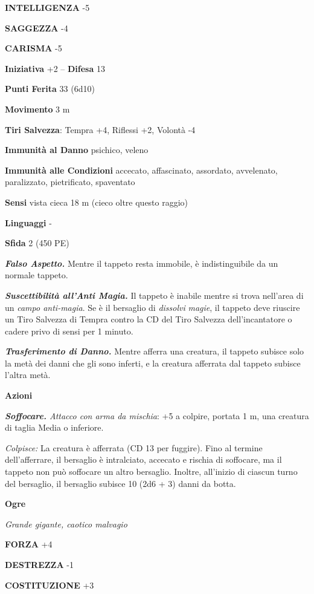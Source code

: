 \begin{multicols}{2}
\textbf{INTELLIGENZA} -5

\textbf{SAGGEZZA} -4

\textbf{CARISMA} -5

\textbf{Iniziativa} +2 -- \textbf{Difesa} 13

\textbf{Punti Ferita} 33 (6d10)

\textbf{Movimento} 3 m

\textbf{Tiri Salvezza}: Tempra +4, Riflessi +2, Volontà -4

\textbf{Immunità al Danno} psichico, veleno

\textbf{Immunità alle Condizioni} accecato, affascinato, assordato, avvelenato, paralizzato, pietrificato, spaventato

\textbf{Sensi} vista cieca 18 m (cieco oltre questo raggio)

\textbf{Linguaggi} -

\textbf{Sfida} 2 (450 PE)

\emph{\textbf{Falso Aspetto.}} Mentre il tappeto resta immobile, è indistinguibile da un normale tappeto.

\emph{\textbf{Suscettibilità all'Anti Magia.}} Il tappeto è inabile mentre si trova nell'area di un \emph{campo anti-magia}. Se è il bersaglio di \emph{dissolvi} \emph{magie}, il tappeto deve riuscire un Tiro Salvezza di Tempra contro la CD del Tiro Salvezza dell'incantatore o cadere privo di sensi per 1 minuto.

\emph{\textbf{Trasferimento di Danno.}} Mentre afferra una creatura, il tappeto subisce solo la metà dei danni che gli sono inferti, e la creatura afferrata dal tappeto subisce l'altra metà.

\textbf{Azioni}

\emph{\textbf{Soffocare.} Attacco con arma da mischia}: +5 a colpire, portata 1 m, una creatura di taglia Media o inferiore.

\emph{Colpisce:} La creatura è afferrata (CD 13 per fuggire). Fino al termine dell'afferrare, il bersaglio è intralciato, accecato e rischia di soffocare, ma il tappeto non può soffocare un altro bersaglio. Inoltre, all'inizio di ciascun turno del bersaglio, il bersaglio subisce 10 (2d6 + 3) danni da botta.

\medskip{}\textbf{Ogre}

\emph{Grande gigante, caotico malvagio}

\textbf{FORZA} +4

\textbf{DESTREZZA} -1

\textbf{COSTITUZIONE} +3


\end{multicols}
